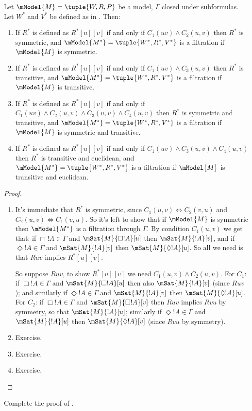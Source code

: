 \documentclass[../../../include/open-logic-section]{subfiles}
\begin{document}
\begin{thm}
  Let $\mModel{M} =\tuple{W,R,P}$ be a model, $\Gamma$ closed under
  subformulas. Let $W^*$ and $V^*$ be defined as in
  . Then:
  \begin{enumerate}
  \item If $R^*$ is defined as $R^*[u][v]$ if and only if $C_1(uv)
    \land C_2(u,v)$ then $R^*$ is symmetric, and
    $\mModel{M^*} = \tuple{W^*,R^*,V^*}$ is a filtration if $\mModel{M}$
    is symmetric.
  \item If $R^*$ is defined as $R^*[u][v]$ if and only if $C_1(uv)
    \land C_3(u,v)$ then $R^*$ is transitive, and
    $\mModel{M^*}=\tuple{W^*,R^*,V^*}$ is a filtration if $\mModel{M}$
    is transitive.
  \item If $R^*$ is defined as $R^*[u][v]$ if and only if $C_1(uv)
    \land C_2(u,v) \land C_3(u,v) \land C_4(u,v)$ then $R^*$ is
    symmetric and transitive, and $\mModel{M^*}=\tuple{W^*,R^*,V^*}$
    is a filtration if $\mModel{M}$ is symmetric and transitive.
  \item If $R^*$ is defined as $R^*[u][v]$ if and only if $C_1(uv)
    \land C_3(u,v) \land C_4(u,v)$ then $R^*$ is transitive and
    euclidean, and $\mModel{M^*}=\tuple{W^*,R^*,V^*}$ is a filtration
    if $\mModel{M}$ is transitive and euclidean.
  \end{enumerate}
\end{thm}

\begin{proof}
  \begin{enumerate}
    \item It's immediate that $R^*$ is symmetric, since $C_1(u,v)
      \Leftrightarrow C_2(v,u)$ and $C_2(u,v) \Leftrightarrow
      C_1(v,u)$. So it's left to show that if $\mModel{M}$ is
      symmetric then $\mModel{M^*}$ is a filtration through
      $\Gamma$. By condition $C_1(u,v)$ we get that: if $\Box!A \in
      \Gamma$ and $\mSat{M}{\Box!A}[u]$ then $\mSat{M}{!A}[v]$, and if
      $\Diamond!A \in \Gamma$ and $\mSat{M}{!A}[v]$ then
      $\mSat{M}{\Diamond!A}[u]$. So all we need is that $Ruv$ implies
      $R^*[u][v]$.

      So suppose $Ruv$, to show $R^*[u][v]$ we need $C_1(u,v) \land
      C_2(u,v)$. For $C_1$: if $\Box!A \in\Gamma$ and
      $\mSat{M}{\Box!A}[u]$ then also $\mSat{M}{!A}[v]$ (since $Ruv$);
      and similarly if $\Diamond!A \in \Gamma$ and $\mSat{M}{!A}[v]$
      then $\mSat{M}{\Diamond!A}[u]$. For $C_2$: if $\Box!A \in
      \Gamma$ and $\mSat{M}{\Box!A}[v]$ then $Ruv$ implies $Rvu$ by
      symmetry, so that $\mSat{M}{!A}[u]$; similarly if $\Diamond!A
      \in\Gamma$ and $\mSat{M}{!A}[u]$ then $\mSat{M}{\Diamond!A}[v]$
      (since $Rvu$ by symmetry).
    \item Exercise.
    \item Exercise.
    \item Exercise.
  \end{enumerate}
\end{proof}

\begin{prob}
  Complete the proof of .
\end{prob}
\end{document}
